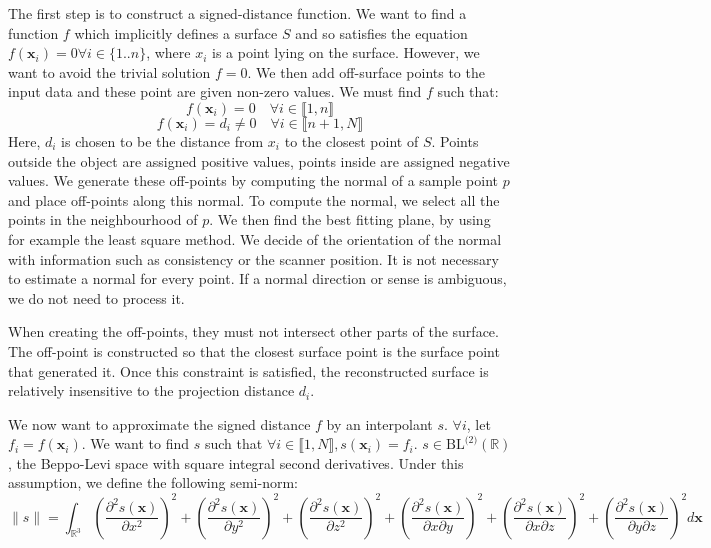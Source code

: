 \documentclass[12pt]{article}
\begin{document}
The first step is to construct a signed-distance function. We want to find a function $f$ which implicitly defines a surface $S$ and so satisfies the equation $f(\boldsymbol{x}_i) = 0 \forall i \in \{1..n\}$, where $x_i$ is a point lying on the surface. However, we want to avoid the trivial solution $f = 0$. We then add off-surface points to the input data and these point are given non-zero values. We must find $f$ such that:
$$f(\boldsymbol{x}_i) = 0 \hspace{1em}\forall i \in \llbracket 1,n\rrbracket$$
$$f(\boldsymbol{x}_i) = d_i \ne 0 \hspace{1em}\forall i \in\llbracket n+1,N\rrbracket$$
Here, $d_i$ is chosen to be the distance from $x_i$ to the closest point of $S$. Points outside the object are assigned positive values, points inside are assigned negative values. We generate these off-points by computing the normal of a sample point $p$ and place off-points along this normal. To compute the normal, we select all the points in the neighbourhood of $p$. We then find the best fitting plane, by using for example the least square method. We decide of the orientation of the normal with information such as consistency or the scanner position. It is not necessary to estimate a normal for every point. If a normal direction or sense is ambiguous, we do not need to process it.

When creating the off-points, they must not intersect other parts of the surface. The off-point is constructed so that the closest surface point is the surface point that generated it. Once this constraint is satisfied, the reconstructed surface is relatively insensitive to the projection distance $d_i$.

We now want to approximate the signed distance $f$ by an interpolant $s$. $\forall i$, let $f_i = f(\boldsymbol{x}_i)$. We want to find $s$ such that $\forall i\in\llbracket 1,N\rrbracket, s(\boldsymbol{x}_i) = f_i$. $s \in \text{BL}^{\text{(2)}}(\mathbb{R})$, the Beppo-Levi space with square integral second derivatives. Under this assumption, we define the following semi-norm:
$$\|s\| = \int_{\mathbb{R}^3}\left(\frac{\partial^2s(\boldsymbol{x})}{\partial x^2}\right)^2 + \left(\frac{\partial^2s(\boldsymbol{x})}{\partial y^2}\right)^2 + \left(\frac{\partial^2s(\boldsymbol{x})}{\partial z^2}\right)^2 + \left(\frac{\partial^2s(\boldsymbol{x})}{\partial x\partial y}\right)^2 + \left(\frac{\partial^2s(\boldsymbol{x})}{\partial x\partial z}\right)^2 + \left(\frac{\partial^2s(\boldsymbol{x})}{\partial y\partial z}\right)^2 d\boldsymbol{x}$$
\end{document}
